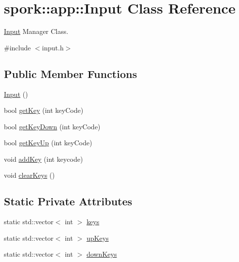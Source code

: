 \hypertarget{classspork_1_1app_1_1_input}{}\section{spork\+:\+:app\+:\+:Input Class Reference}
\label{classspork_1_1app_1_1_input}


\hyperlink{classspork_1_1app_1_1_input}{Input} Manager Class.  




{\ttfamily \#include $<$input.\+h$>$}

\subsection*{Public Member Functions}
\begin{DoxyCompactItemize}
\item 
\hyperlink{classspork_1_1app_1_1_input_ade1285875cb237a23704d76b69957989}{Input} ()
\item 
bool \hyperlink{classspork_1_1app_1_1_input_a49050175fcca31843c59cbdeb1cfbc88}{get\+Key} (int key\+Code)
\item 
bool \hyperlink{classspork_1_1app_1_1_input_a5204953f654ba10336f5ab9c61ca314c}{get\+Key\+Down} (int key\+Code)
\item 
bool \hyperlink{classspork_1_1app_1_1_input_a2454efa1c6f96d5dca7229889f58f2b4}{get\+Key\+Up} (int key\+Code)
\item 
void \hyperlink{classspork_1_1app_1_1_input_a11538adf219ba9bbe9b450efa166ab3b}{add\+Key} (int keycode)
\item 
void \hyperlink{classspork_1_1app_1_1_input_a422c08ccd18bb23ea7c075e4f79e2d80}{clear\+Keys} ()
\end{DoxyCompactItemize}
\subsection*{Static Private Attributes}
\begin{DoxyCompactItemize}
\item 
static std\+::vector$<$ int $>$ \hyperlink{classspork_1_1app_1_1_input_ac72b6ae8e2a966c7c2acb94cfa2a99f4}{keys}
\item 
static std\+::vector$<$ int $>$ \hyperlink{classspork_1_1app_1_1_input_a7820f843c7008add303c10b3c8e28423}{up\+Keys}
\item 
static std\+::vector$<$ int $>$ \hyperlink{classspork_1_1app_1_1_input_aeddda0deeb063ab432c6be8addd2b268}{down\+Keys}
\end{DoxyCompactItemize}


